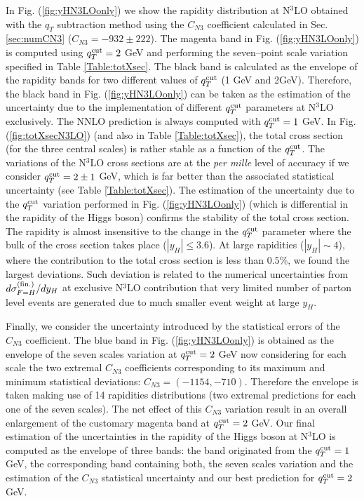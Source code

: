 \documentclass[12pt]{article}
\begin{document}
In Fig. (\ref{fig:yHN3LOonly}) we show the rapidity distribution at N$^{3}$LO obtained with the $q_{T}$ subtraction method using the $C_{N3}$ coefficient calculated in Sec. \ref{sec:numCN3} ($C_{N3}=-932 \pm 222$). The magenta band in Fig. (\ref{fig:yHN3LOonly}) is computed using $q_{T}^{\rm cut}=2$ GeV and performing the seven--point scale variation specified in Table \ref{Table:totXsec}. The black band is calculated as the envelope of the rapidity bands for two different values of $q_{T}^{\rm cut}$ (1 GeV and 2GeV). Therefore, the black band in Fig. (\ref{fig:yHN3LOonly}) can be taken as the estimation of the uncertainty due to the implementation of different $q_{T}^{\rm cut}$ parameters at N$^{3}$LO exclusively. The NNLO prediction is always computed with $q_{T}^{\rm cut}=1$ GeV. In Fig. (\ref{fig:totXsecN3LO}) (and also in Table \ref{Table:totXsec}), the total cross section (for the three central scales) is rather stable as a function of the $q_{T}^{\rm cut}$. The variations of the N$^{3}$LO cross sections are at the \textit{per mille} level of accuracy if we consider  $q_{T}^{\rm cut}=2 \pm 1$ GeV, which is far better than the associated statistical uncertainty (see Table \ref{Table:totXsec}). The estimation of the uncertainty due to the $q_{T}^{\rm cut}$ variation performed in Fig. (\ref{fig:yHN3LOonly}) (which is differential in the rapidity of the Higgs boson) confirms the stability of the total cross section. The rapidity is almost insensitive to the change in the $q_{T}^{\rm cut}$ parameter where the bulk of the cross section takes place ($|y_{H}| \leq 3.6$). At large rapidities ($|y_{H}| \sim 4$), where the contribution to the total cross section is less than $0.5\%$, we found the largest deviations. Such deviation is related to the numerical uncertainties from $d\sigma_{F=H}^{(\rm fin.)}/dy_H$ at exclusive N$^3$LO contribution that very limited number of parton level events are generated due to much smaller event weight at large $y_H$.

Finally, we consider the uncertainty introduced by the statistical errors of the $C_{N3}$ coefficient. The blue band in Fig. (\ref{fig:yHN3LOonly}) is obtained as the envelope of the seven scales variation at $q_{T}^{\rm cut}=2$ GeV now considering for each scale the two extremal $C_{N3}$ coefficients corresponding to its maximum and minimum statistical deviations: $C_{N3} =(-1154,-710)$. Therefore the envelope is taken making use of 14 rapidities distributions (two extremal predictions for each one of the seven scales). The net effect of this $C_{N3}$ variation result in an overall enlargement of the customary magenta band at $q_{T}^{\rm cut}=2$ GeV. Our final estimation of the uncertainties in the rapidity of the Higgs boson at N$^{3}$LO is computed as the envelope of three bands: the band originated from the $q_{T}^{\rm cut}=1$ GeV,  the corresponding band containing both, the seven scales variation and the estimation of the $C_{N3}$ statistical uncertainty and our best prediction for $q_{T}^{\rm cut}=2$ GeV.
\end{document}
